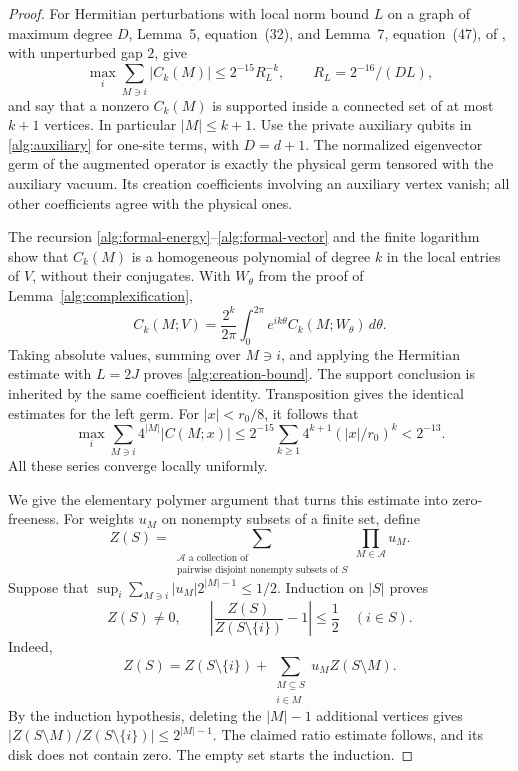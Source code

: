 \documentclass[reqno]{amsart}
\theoremstyle{definition}
\theoremstyle{remark}
\begin{document}
\begin{proof}
For Hermitian perturbations with local norm bound \(L\) on a graph
of maximum degree \(D\), Lemma~5, equation~(32), and Lemma~7,
equation~(47), of \cite{BDL08}, with unperturbed gap \(2\), give
\[
 \max_i\sum_{M\ni i}|C_k(M)|\le2^{-15}R_L^{-k},
 \qquad R_L=2^{-16}/(DL),
\]
and say that a nonzero \(C_k(M)\) is supported inside a connected
set of at most \(k+1\) vertices.  In particular \(|M|\le k+1\).
Use the private auxiliary qubits in \eqref{alg:auxiliary} for
one-site terms, with \(D=d+1\).  The normalized eigenvector germ
of the augmented operator is exactly the physical germ tensored
with the auxiliary vacuum.  Its creation coefficients involving
an auxiliary vertex vanish; all other coefficients agree with
the physical ones.

The recursion \eqref{alg:formal-energy}--\eqref{alg:formal-vector}
and the finite logarithm show that \(C_k(M)\) is a homogeneous
polynomial of degree \(k\) in the local entries of \(V\), without
their conjugates.  With \(W_\theta\) from the proof of
Lemma~\ref{alg:complexification},
\[
 C_k(M;V)=\frac{2^k}{2\pi}\int_0^{2\pi}
              e^{ik\theta}C_k(M;W_\theta)\,d\theta.
\]
Taking absolute values, summing over \(M\ni i\), and applying the
Hermitian estimate with \(L=2J\) proves
\eqref{alg:creation-bound}.  The support conclusion is inherited
by the same coefficient identity.  Transposition gives the
identical estimates for the left germ.
For \(|x|<r_0/8\), it follows that
\begin{equation}\label{alg:weighted-creation}
 \max_i\sum_{M\ni i}4^{|M|}|C(M;x)|
 \le 2^{-15}\sum_{k\ge1}4^{k+1}(|x|/r_0)^k
 <2^{-13}.
\end{equation}
All these series converge locally uniformly.

We give the elementary polymer argument that turns this estimate
into zero-freeness.  For weights \(u_M\) on nonempty subsets of a
finite set, define
\[
 Z(S)=\sum_{\substack{\mathcal A\text{ a collection of}\\
              \text{pairwise disjoint nonempty subsets of }S}}
                       \prod_{M\in\mathcal A}u_M .
\]
Suppose that
\(\sup_i\sum_{M\ni i}|u_M|2^{|M|-1}\le1/2\).
Induction on \(|S|\) proves
\begin{equation}\label{alg:polymer-ratio}
 Z(S)\ne0,\qquad
 \left|\frac{Z(S)}{Z(S\setminus\{i\})}-1\right|\le\frac12
 \quad(i\in S).
\end{equation}
Indeed,
\[
 Z(S)=Z(S\setminus\{i\})+
           \sum_{\substack{M\subseteq S\\i\in M}}u_M Z(S\setminus M).
\]
By the induction hypothesis, deleting the \(|M|-1\) additional
vertices gives
\(\left|Z(S\setminus M)/Z(S\setminus\{i\})\right|
 \le2^{|M|-1}\).
The claimed ratio estimate follows, and its disk does not contain
zero.  The empty set starts the induction.


\end{proof}
\end{document}
